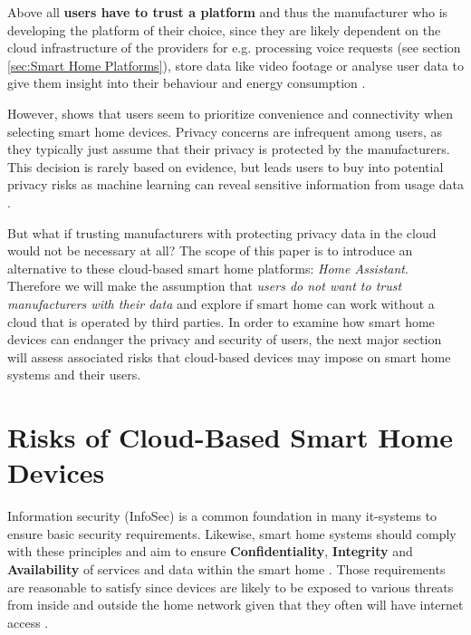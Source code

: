 Above all \textbf{users have to trust a platform} and thus the manufacturer who is developing the platform of their choice, since they are likely dependent on the cloud infrastructure of the providers for e.g. processing voice requests (see section \ref{sec:Smart Home Platforms}), store data like video footage \cite{Kastrenakes2019HKSC} or analyse user data to give them insight into their behaviour \cite{Liao2018AH} and energy consumption \cite{SamsungSmartThingsEnergy}.

However, \cite{ZhengSerena2018UPoS} shows that users seem to prioritize convenience and connectivity when selecting smart home devices. Privacy concerns are infrequent among users, as they typically just assume that their privacy is protected by the manufacturers. This decision is rarely based on evidence, but leads users to buy into potential privacy risks as machine learning can reveal sensitive information from usage data \cite{ZhengSerena2018UPoS}.

But what if trusting manufacturers with protecting privacy data in the cloud would not be necessary at all? The scope of this paper is to introduce an alternative to these cloud-based smart home platforms: \textit{Home Assistant}. Therefore we will make the assumption that \textit{users do not want to trust manufacturers with their data} and explore if smart home can work without a cloud that is operated by third parties. In order to examine how smart home devices can endanger the privacy and security of users, the next major section will assess associated risks that cloud-based devices may impose on smart home systems and their users.

\newpage


\section{Risks of Cloud-Based Smart Home Devices}
Information security (InfoSec) is a common foundation in many it-systems to ensure basic security requirements. Likewise, smart home systems should comply with these principles and aim to ensure \textbf{Confidentiality}, \textbf{Integrity} and \textbf{Availability} of services and data within the smart home \cite{SecurityConsiderations-7354752}. Those requirements are reasonable to satisfy since devices are likely to be exposed to various threats from inside and outside the home network given that they often will have internet access \cite{SecurityConsiderations-7354752}.

